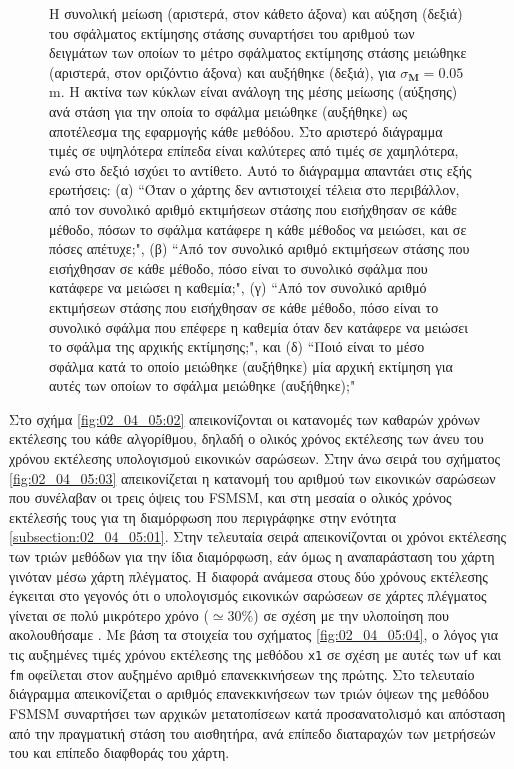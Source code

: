 \begin{figure}\vspace{3cm}%
  
  \vspace{1cm}
  \caption{\small Η συνολική μείωση (αριστερά, στον κάθετο άξονα) και αύξηση
           (δεξιά) του σφάλματος εκτίμησης στάσης συναρτήσει του αριθμού των
           δειγμάτων των οποίων το μέτρο σφάλματος εκτίμησης στάσης μειώθηκε
           (αριστερά, στον οριζόντιο άξονα) και αυξήθηκε (δεξιά), για
           $\sigma_{\bm{M}} = 0.05$ m. Η ακτίνα των κύκλων είναι ανάλογη της
           μέσης μείωσης (αύξησης) ανά στάση για την οποία το σφάλμα μειώθηκε
           (αυξήθηκε) ως αποτέλεσμα της εφαρμογής κάθε μεθόδου. Στο αριστερό
           διάγραμμα τιμές σε υψηλότερα επίπεδα είναι καλύτερες από τιμές σε
           χαμηλότερα, ενώ στο δεξιό ισχύει το αντίθετο. Αυτό το
           διάγραμμα απαντάει στις εξής ερωτήσεις: (α) ``Όταν ο χάρτης δεν
           αντιστοιχεί τέλεια στο περιβάλλον, από τον συνολικό αριθμό
           εκτιμήσεων στάσης που εισήχθησαν σε κάθε μέθοδο, πόσων το σφάλμα
           κατάφερε η κάθε μέθοδος να μειώσει, και σε πόσες απέτυχε;", (β)
           ``Από τον συνολικό αριθμό εκτιμήσεων στάσης που εισήχθησαν σε κάθε
           μέθοδο, πόσο είναι το συνολικό σφάλμα που κατάφερε να μειώσει η
           καθεμία;", (γ) ``Από τον συνολικό αριθμό εκτιμήσεων στάσης που
           εισήχθησαν σε κάθε μέθοδο, πόσο είναι το συνολικό σφάλμα που επέφερε
           η καθεμία όταν δεν κατάφερε να μειώσει το σφάλμα της αρχικής
           εκτίμησης;", και (δ) ``Ποιό είναι το μέσο σφάλμα κατά το οποίο
           μειώθηκε (αυξήθηκε) μία αρχική εκτίμηση για αυτές των οποίων το
           σφάλμα μειώθηκε (αυξήθηκε);"}
  \label{fig:02_04_05:01_circles_sm5}
\end{figure}

Στο σχήμα \ref{fig:02_04_05:02} απεικονίζονται οι κατανομές των καθαρών χρόνων
εκτέλεσης του κάθε αλγορίθμου, δηλαδή ο ολικός χρόνος εκτέλεσης των άνευ του
χρόνου εκτέλεσης υπολογισμού εικονικών σαρώσεων. Στην άνω σειρά του σχήματος
\ref{fig:02_04_05:03} απεικονίζεται η κατανομή του αριθμού των εικονικών
σαρώσεων που συνέλαβαν οι τρεις όψεις του FSMSM, και στη μεσαία ο ολικός χρόνος
εκτέλεσής τους για τη διαμόρφωση που περιγράφηκε στην ενότητα
\ref{subsection:02_04_05:01}. Στην τελευταία σειρά απεικονίζονται οι χρόνοι
εκτέλεσης των τριών μεθόδων για την ίδια διαμόρφωση, εάν όμως η αναπαράσταση του
χάρτη γινόταν μέσω χάρτη πλέγματος. Η διαφορά ανάμεσα στους δύο χρόνους
εκτέλεσης έγκειται στο γεγονός ότι ο υπολογισμός εικονικών σαρώσεων σε χάρτες
πλέγματος γίνεται σε πολύ μικρότερο χρόνο ($\simeq 30\%$) σε σχέση με την
υλοποίηση που ακολουθήσαμε \cite{Walsh2018}. Με βάση τα στοιχεία του σχήματος
\ref{fig:02_04_05:04}, ο λόγος για τις αυξημένες τιμές χρόνου εκτέλεσης της
μεθόδου \texttt{x1} σε σχέση με αυτές των \texttt{uf} και \texttt{fm} οφείλεται
στον αυξημένο αριθμό επανεκκινήσεων της πρώτης. Στο τελευταίο διάγραμμα
απεικονίζεται ο αριθμός επανεκκινήσεων των τριών όψεων της μεθόδου FSMSM
συναρτήσει των αρχικών μετατοπίσεων κατά προσανατολισμό και απόσταση από
την πραγματική στάση του αισθητήρα, ανά επίπεδο διαταραχών των μετρήσεών του
και επίπεδο διαφθοράς του χάρτη.

